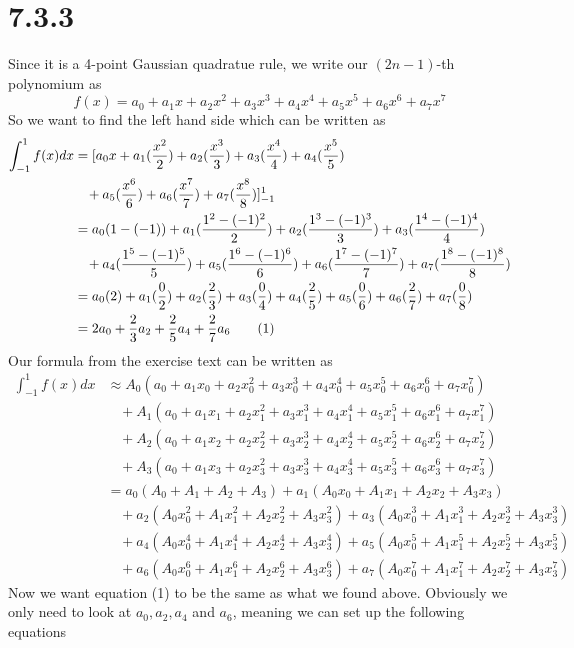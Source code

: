 \documentclass[12pt]{article}
\author{Nikolaj Dybdahl Rathcke}
\begin{document}
\section*{7.3.3}
Since it is a 4-point Gaussian quadratue rule, we write our $(2n-1)$-th polynomium as
$$f(x)=a_0+a_1x+a_2x^2+a_3x^3+a_4x^4+a_5x^5+a_6x^6+a_7x^7$$
So we want to find the left hand side which can be written as
\begin{align*}
\int_{-1}^1f(x)dx &=[a_0x+a_1(\frac{x^2}{2})+a_2(\frac{x^3}{3})+a_3(\frac{x^4}{4})+a_4(\frac{x^5}{5})\\
&\:\:\:\:+a_5(\frac{x^6}{6})+a_6(\frac{x^7}{7})+a_7(\frac{x^8}{8})]_{-1}^1\\
&=a_0(1-(-1))+a_1(\frac{1^2-(-1)^2}{2})+a_2(\frac{1^3-(-1)^3}{3})+a_3(\frac{1^4-(-1)^4}{4})\\
&\:\:\:\:+a_4(\frac{1^5-(-1)^5}{5})+a_5(\frac{1^6-(-1)^6}{6})+a_6(\frac{1^7-(-1)^7}{7})+a_7(\frac{1^8-(-1)^8}{8})\\
&=a_0(2)+a_1(\frac{0}{2})+a_2(\frac{2}{3})+a_3(\frac{0}{4})+a_4(\frac{2}{5})
+a_5(\frac{0}{6})+a_6(\frac{2}{7})+a_7(\frac{0}{8})\\
&=2a_0+\frac{2}{3}a_2+\frac{2}{5}a_4+\frac{2}{7}a_6 \addtocounter{equation}{1}\tag{\theequation}
\end{align*}
Our formula from the exercise text can be written as
\begin{align*}
\int_{-1}^1f(x)dx &\approx A_0(a_0+a_1x_0+a_2x_0^2+a_3x_0^3+a_4x_0^4+a_5x_0^5+a_6x_0^6+a_7x_0^7)\\
&\:\:\:\:+A_1(a_0+a_1x_1+a_2x_1^2+a_3x_1^3+a_4x_1^4+a_5x_1^5+a_6x_1^6+a_7x_1^7)\\
&\:\:\:\:+A_2(a_0+a_1x_2+a_2x_2^2+a_3x_2^3+a_4x_2^4+a_5x_2^5+a_6x_2^6+a_7x_2^7)\\
&\:\:\:\:+A_3(a_0+a_1x_3+a_2x_3^2+a_3x_3^3+a_4x_3^4+a_5x_3^5+a_6x_3^6+a_7x_3^7)\\
&=a_0(A_0+A_1+A_2+A_3)+a_1(A_0x_0+A_1x_1+A_2x_2+A_3x_3)\\
&\:\:\:\:+a_2(A_0x_0^2+A_1x_1^2+A_2x_2^2+A_3x_3^2)+a_3(A_0x_0^3+A_1x_1^3+A_2x_2^3+A_3x_3^3)\\
&\:\:\:\:+a_4(A_0x_0^4+A_1x_1^4+A_2x_2^4+A_3x_3^4)+a_5(A_0x_0^5+A_1x_1^5+A_2x_2^5+A_3x_3^5)\\
&\:\:\:\:+a_6(A_0x_0^6+A_1x_1^6+A_2x_2^6+A_3x_3^6)+a_7(A_0x_0^7+A_1x_1^7+A_2x_2^7+A_3x_3^7)
\end{align*}
Now we want equation (1) to be the same as what we found above. Obviously we only need to look at $a_0,a_2,a_4$ and $a_6$, meaning we can set up the following equations
\end{document}
